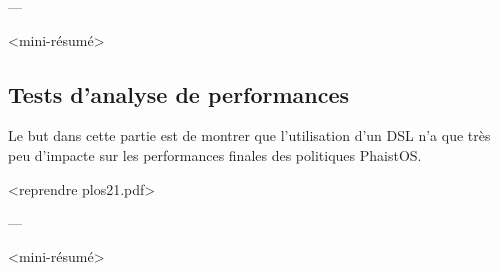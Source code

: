 \begin{center}
---
\end{center}
    
<mini-résumé>

\subsection{Tests d'analyse de performances}

Le but dans cette partie est de montrer que l'utilisation d'un DSL n'a que très peu d'impacte sur les performances finales des politiques PhaistOS.

<reprendre plos21.pdf>

\begin{center}
---
\end{center}
    
<mini-résumé>
